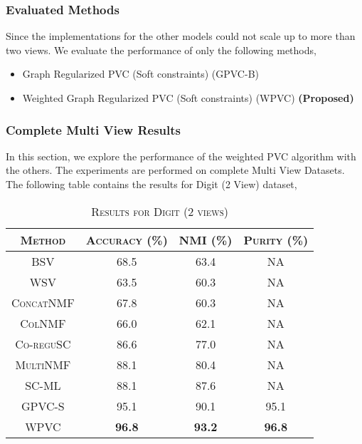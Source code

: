 \documentclass[a4paper]{article}
\begin{document}
	\subsubsection{Evaluated Methods}
		
	Since the implementations for the other models could not scale up to more than two views. We evaluate the performance of only the following methods,
	\begin{itemize}
	\item {Graph Regularized PVC (Soft constraints) (GPVC-B)	\cite{wangfeature}}
	\item {Weighted Graph Regularized PVC (Soft constraints) (WPVC)	\small\textbf{(Proposed)}}
	\end{itemize}	

	\subsubsection{Complete Multi View Results}
	
	In this section, we explore the performance of the weighted PVC algorithm with the others. The experiments are performed on complete Multi View Datasets. The following table contains the results for Digit (2 View) dataset,	
	\begin{table}[h!]
	  \begin{center}
	    \begin{tabular}{c|c|c|c}
	      \toprule
	      \textsc{Method} & \textsc{Accuracy (\%) } & \textsc{NMI (\%) } 
	      & \textsc{Purity (\%)} 	\\
            
		  \midrule
			\textsc{BSV \cite{xu2003document}} & 68.5 & 63.4 & NA\\
			\textsc{WSV \cite{xu2003document}} & 63.5 & 60.3 & NA\\
			\textsc{ConcatNMF \cite{xu2003document}} & 67.8 & 60.3 & NA\\
			\textsc{ColNMF \cite{akata2011non}} & 66.0 & 62.1 & NA\\
			\textsc{Co-reguSC \cite{kumar2011co}} & 86.6 & 77.0 & NA\\
			\textsc{MultiNMF \cite{nmfsdm}} & 88.1 & 80.4 & NA\\
			\textsc{SC-ML \cite{dong2014clustering}} & 88.1 & 87.6 & NA\\
			\textsc{GPVC-S \cite{wangfeature}} & 95.1 & 90.1 & 95.1\\  
			\textsc{WPVC} & \textbf{96.8} & \textbf{93.2} & \textbf{96.8}\\
		  
		  \bottomrule
	    \end{tabular}
	    \caption*{\textsc{Results for Digit (2 views)}}
	  \end{center}
	\end{table}		
	
\end{document}
